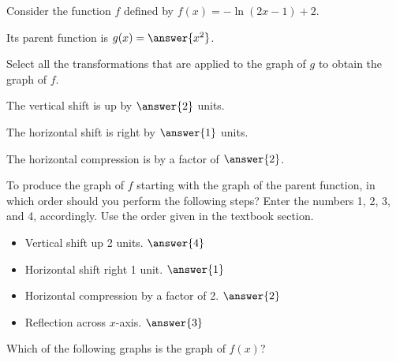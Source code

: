 \documentclass{ximera}
\author{Kenneth Berglund}
\begin{document}
\begin{exercise}
Consider the function $f$ defined by $f(x) = -\ln(2x - 1) + 2$.

Its parent function is $g(x) = \answer{x^2}$. 

\begin{exercise}
Select all the transformations that are applied to the graph of $g$ to obtain the graph of $f$.
\begin{selectAll}
\end{selectAll}

\begin{exercise}
The vertical shift is up by $\answer{2}$ units.

The horizontal shift is right by $\answer{1}$ units.


The horizontal compression is by a factor of $\answer{2}$.

\begin{exercise}
To produce the graph of $f$ starting with the graph of the parent function, in which order should you perform the following steps? Enter the numbers 1, 2, 3, and 4, accordingly. Use the order given in the textbook section.
\begin{itemize}
\item Vertical shift up 2 units. $\answer{4}$
\item Horizontal shift right 1 unit. $\answer{1}$
\item Horizontal compression by a factor of 2. $\answer{2}$
\item Reflection across $x$-axis. $\answer{3}$
\end{itemize}
Which of the following graphs is the graph of $f(x)$?


\end{exercise}
\end{exercise}
\end{exercise}
\end{exercise}
\end{document}

